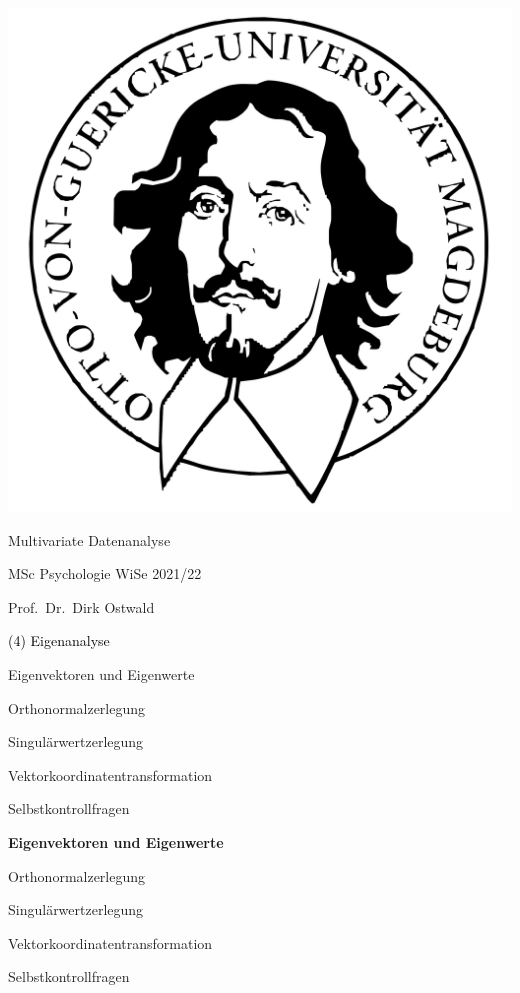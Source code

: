 \documentclass[
  8pt,
  ignorenonframetext,
]{beamer}
\author{}
\date{\vspace{-2.5em}}
\begin{document}
\begin{frame}[plain]{}
\protect\hypertarget{section}{}
\center

\begin{center}\includegraphics[width=0.2\linewidth]{4_Abbildungen/mvda_4_otto} \end{center}

\vspace{2mm}

\Huge

Multivariate Datenanalyse \vspace{6mm}

\large

MSc Psychologie WiSe 2021/22

\vspace{6mm}
\large

Prof.~Dr.~Dirk Ostwald
\end{frame}

\begin{frame}[plain]{}
\protect\hypertarget{section-1}{}
\vfill
\center
\huge

\textcolor{black}{(4) Eigenanalyse} \vfill
\end{frame}

\begin{frame}{}
\protect\hypertarget{section-2}{}
\vfill
{}
\Large

Eigenvektoren und Eigenwerte

Orthonormalzerlegung

Singulärwertzerlegung

Vektorkoordinatentransformation

Selbstkontrollfragen \vfill 
\end{frame}

\begin{frame}{}
\protect\hypertarget{section-3}{}
\vfill
{}
\Large

\textbf{Eigenvektoren und Eigenwerte}

Orthonormalzerlegung

Singulärwertzerlegung

Vektorkoordinatentransformation

Selbstkontrollfragen \vfill 
\end{frame}
\end{document}
